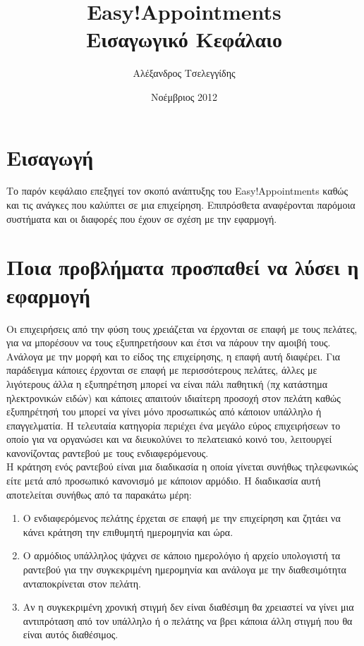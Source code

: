 \documentclass[12pt]{article}
\title{{\Huge {\bf Easy!Appointments}} \\[0.3cm] Εισαγωγικό Κεφάλαιο}
\author{Αλέξανδρος Τσελεγγίδης}
\date{Νοέμβριος 2012}
\begin{document}
\maketitle 
\thispagestyle{empty} %
\pagebreak

\section* {Εισαγωγή} %
Το παρόν κεφάλαιο επεξηγεί τον σκοπό ανάπτυξης του Easy!Appointments καθώς και τις ανάγκες που καλύπτει σε μια επιχείρηση. Επιπρόσθετα αναφέρονται παρόμοια συστήματα και οι διαφορές που έχουν σε σχέση με την εφαρμογή. 

\section {Ποια προβλήματα προσπαθεί να λύσει η εφαρμογή}
Οι επιχειρήσεις από την φύση τους χρειάζεται να έρχονται σε επαφή με τους πελάτες, για να μπορέσουν να τους εξυπηρετήσουν και έτσι να πάρουν την αμοιβή τους. Ανάλογα με την μορφή και το είδος της επιχείρησης, η επαφή αυτή διαφέρει. Για παράδειγμα κάποιες έρχονται σε επαφή με περισσότερους πελάτες, άλλες με λιγότερους άλλα η εξυπηρέτηση μπορεί να είναι πάλι παθητική (πχ κατάστημα ηλεκτρονικών ειδών) και κάποιες απαιτούν ιδιαίτερη προσοχή στον πελάτη καθώς εξυπηρέτησή του μπορεί να γίνει μόνο προσωπικώς από κάποιον υπάλληλο ή επαγγελματία. Η τελευταία κατηγορία περιέχει ένα μεγάλο εύρος επιχειρήσεων το οποίο για να οργανώσει και να διευκολύνει το πελατειακό κοινό του, λειτουργεί κανονίζοντας ραντεβού με τους ενδιαφερόμενους.
\\[0.3cm]
Η κράτηση ενός ραντεβού είναι μια διαδικασία η οποία γίνεται συνήθως τηλεφωνικώς είτε μετά από προσωπικό κανονισμό με κάποιον αρμόδιο. Η διαδικασία αυτή αποτελείται συνήθως από τα παρακάτω μέρη:  
\begin{enumerate}
\item Ο ενδιαφερόμενος πελάτης έρχεται σε επαφή με την επιχείρηση και ζητάει να κάνει κράτηση την επιθυμητή ημερομηνία και ώρα. 
\item Ο αρμόδιος υπάλληλος ψάχνει σε κάποιο ημερολόγιο ή αρχείο υπολογιστή τα ραντεβού για την συγκεκριμένη ημερομηνία και ανάλογα με την διαθεσιμότητα ανταποκρίνεται στον πελάτη.
\item Αν η συγκεκριμένη χρονική στιγμή δεν είναι διαθέσιμη θα χρειαστεί να γίνει μια αντιπρόταση από τον υπάλληλο ή ο πελάτης να βρει κάποια άλλη στιγμή που θα είναι αυτός διαθέσιμος.
\end{enumerate} 
\end{document}
